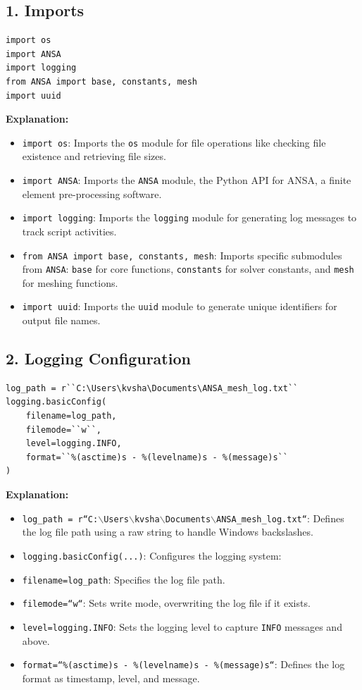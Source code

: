 \documentclass{book}
\begin{document}
\begin{itemize}[leftmargin=*,label=\textbullet]
\subsection*{1. Imports}
\begin{lstlisting}[caption={Imports},label={lst:imports}]
import os
import ANSA
import logging
from ANSA import base, constants, mesh
import uuid
\end{lstlisting}
\textbf{Explanation:}
\begin{itemize}
    \item \texttt{import os}: Imports the \texttt{os} module for file operations like checking file existence and retrieving file sizes.
    \item \texttt{import ANSA}: Imports the \texttt{ANSA} module, the Python API for ANSA, a finite element pre-processing software.
    \item \texttt{import logging}: Imports the \texttt{logging} module for generating log messages to track script activities.
    \item \texttt{from ANSA import base, constants, mesh}: Imports specific submodules from \texttt{ANSA}: \texttt{base} for core functions, \texttt{constants} for solver constants, and \texttt{mesh} for meshing functions.
    \item \texttt{import uuid}: Imports the \texttt{uuid} module to generate unique identifiers for output file names.
\end{itemize}

\subsection*{2. Logging Configuration}
\begin{lstlisting}[caption={Logging Configuration},label={lst:logging}]
log_path = r``C:\Users\kvsha\Documents\ANSA_mesh_log.txt``
logging.basicConfig(
    filename=log_path,
    filemode=``w``,
    level=logging.INFO,
    format=``%(asctime)s - %(levelname)s - %(message)s``
)
\end{lstlisting}
\textbf{Explanation:}
\begin{itemize}
    \item \texttt{log\_path = r``C:$\backslash$Users$\backslash$kvsha$\backslash$Documents$\backslash$ANSA\_mesh\_log.txt``}: Defines the log file path using a raw string to handle Windows backslashes.
    \item \texttt{logging.basicConfig(...)}: Configures the logging system:
    \item \texttt{filename=log\_path}: Specifies the log file path.
    \item \texttt{filemode=``w``}: Sets write mode, overwriting the log file if it exists.
    \item \texttt{level=logging.INFO}: Sets the logging level to capture \texttt{INFO} messages and above.
    \item \texttt{format=``\%(asctime)s - \%(levelname)s - \%(message)s``}: Defines the log format as timestamp, level, and message.
\end{itemize}


\end{itemize}
\end{document}
